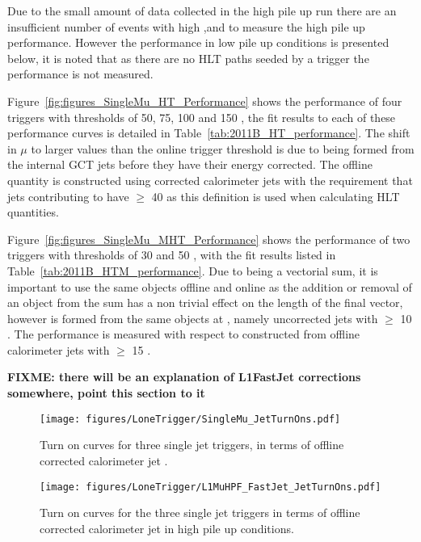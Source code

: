 Due to the small amount of data collected in the high pile up run there are 
an insufficient number of events with high \MET,\HTm and \HT to measure the 
high pile up performance. However the performance in low pile up conditions is 
presented below, it is noted that as there are no HLT paths seeded by a \Lone 
\ET trigger the performance is not measured.

Figure~\ref{fig:figures_SingleMu_HT_Performance} shows the performance of four
\Lone \HT triggers with thresholds of 50, 75, 100 and 150 \GeV, the fit results 
to each of these performance curves is detailed in 
Table~\ref{tab:2011B_HT_performance}. The shift in $\mu$ to larger values than 
the online \Lone trigger threshold is due to \Lone \HT being formed from the 
internal GCT jets before they have their energy corrected. The offline quantity 
is constructed using corrected \AK calorimeter jets with the requirement that 
jets contributing to \HT have \ET $\geq$ 40 \GeV as this definition is used when calculating HLT quantities.

Figure~\ref{fig:figures_SingleMu_MHT_Performance} shows the performance of two 
\Lone \HTm triggers with thresholds of 30 and 50 \GeV, with the fit results 
listed in Table~\ref{tab:2011B_HTM_performance}. Due to \HTm being a vectorial 
sum, it is important to use the same objects offline and online as the addition 
or removal of an object from the sum has a non trivial effect on the length of 
the final vector, however \Lone \HTm is formed from the same objects at \Lone 
\HT, namely uncorrected \Lone jets with \ET $\geq$ 10 \GeV. The performance is 
measured with respect to \HTm constructed from offline \AK calorimeter jets 
with \ET $\geq$ 15 \GeV.



\textbf{FIXME: there will be an explanation of L1FastJet corrections somewhere, 
point this section to it}
\begin{figure}[ht]
  \centering
    \texttt{[image: figures/LoneTrigger/SingleMu\_JetTurnOns.pdf]}
  \caption{Turn on curves for three \Lone single jet triggers, in terms of 
  offline corrected \AK calorimeter jet \ET.}
  \label{fig:figures_LoneTrigger_SingleMu_JetTurnOns}
\end{figure}

\begin{figure}[ht]
  \centering
    \texttt{[image: figures/LoneTrigger/L1MuHPF\_FastJet\_JetTurnOns.pdf]}
  \caption{Turn on curves for the three \Lone single jet triggers in terms of 
  offline corrected \AK calorimeter jet \ET in high pile up conditions.}
  \label{fig:figures_LoneTrigger_L1MuHPF_FastJet_JetTurnOns}
\end{figure}


